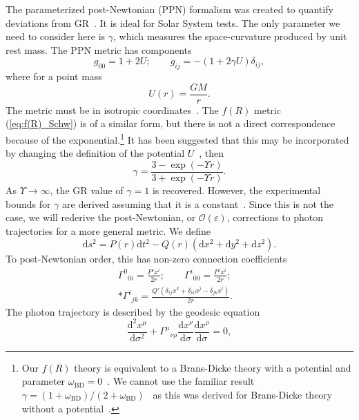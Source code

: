 \documentclass[aps,prd,amsfonts,amssymb,amsmath,nofootinbib,reprint,showpacs]{revtex4-1}
\newcommand{\eqnref}[1]{(\ref{eq:#1})}
\newcommand{\sub}[1]{\ensuremath{_\text{#1}}}
\newcommand{\dd}{\ensuremath{\text{d}}}
\newcommand{\diff}[2]{\ensuremath{\frac{\dd {#1}}{\dd {#2}}}}
\newcommand{\difftwo}[2]{\ensuremath{\frac{\dd^2 {#1}}{\dd {#2}^2}}}
\newcommand{\order}[1]{\ensuremath{\mathcal{O}({#1})}}
\begin{document}
The parameterized post-Newtonian (PPN) formalism was created to quantify deviations from GR~\cite{Will1993, Will2006}. It is ideal for Solar System tests. The only parameter we need to consider here is $\gamma$, which measures the space-curvature produced by unit rest mass. The PPN metric has components
\begin{equation}
g_{00} = 1 + 2U; \qquad g_{ij} = -(1 + 2\gamma U)\delta_{ij},
\end{equation}
where for a point mass
\begin{equation}
U(r) = \frac{GM}{r}.
\end{equation}
The metric must be in isotropic coordinates~\cite{Misner1973,Will1993}. The $f(R)$ metric \eqnref{f(R)_Schw} is of a similar form, but there is not a direct correspondence because of the exponential.\footnote{Our $f(R)$ theory is equivalent to a Brans-Dicke theory with a potential and parameter $\omega\sub{BD} = 0$~\cite{Teyssandier1983, Wands1994}. We cannot use the familiar result $\gamma = (1 + \omega\sub{BD})/(2 + \omega\sub{BD})$~\cite{Will2006} as this was derived for Brans-Dicke theory without a potential~\cite{Will1993}.} It has been suggested that this may be incorporated by changing the definition of the potential $U$~\cite{Olmo2007c, Faulkner2007, Bisabr2010, DeFelice2010}, then
\begin{equation}
\gamma = \frac{3 - \exp(-\Upsilon r)}{3 + \exp(-\Upsilon r)}.
\end{equation}
As $\Upsilon \rightarrow \infty$, the GR value of $\gamma = 1$ is recovered. However, the experimental bounds for $\gamma$ are derived assuming that it is a constant~\cite{Will1993}. Since this is not the case, we will rederive the post-Newtonian, or $\order{\varepsilon}$, corrections to photon trajectories for a more general metric. We define
\begin{equation}
\dd s^2 = P(r)\dd t^2 - Q(r)\left(\dd x^2 + \dd y^2 + \dd z^2\right).
\end{equation}
To post-Newtonian order, this has non-zero connection coefficients
\begin{equation}
\begin{split}
{\Gamma^0}_{0i} = \frac{P'x^i}{2r}; \qquad {\Gamma^i}_{00} = \frac{P'x^i}{2r}; \quad\\*
{\Gamma^i}_{jk} = \frac{Q'(\delta_{ij}x^k + \delta_{ik}x^j-\delta_{jk}x^i)}{2r}.
\end{split}
\end{equation}
The photon trajectory is described by the geodesic equation
\begin{equation}
\difftwo{x^\mu}{\sigma} + {\Gamma^\mu}_{\nu\rho}\diff{x^\nu}{\sigma}\diff{x^\rho}{\sigma} = 0,
\label{eq:Geodesic}
\end{equation}
\end{document}
